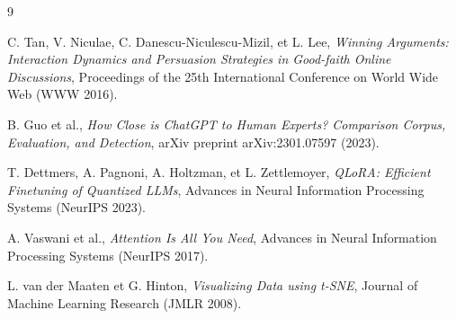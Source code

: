 \documentclass[11pt,a4paper]{article}
\begin{document}
\newpage
\begin{thebibliography}{9}

C. Tan, V. Niculae, C. Danescu-Niculescu-Mizil, et L. Lee,
\textit{Winning Arguments: Interaction Dynamics and Persuasion Strategies in Good-faith Online Discussions},
Proceedings of the 25th International Conference on World Wide Web (WWW 2016).

B. Guo et al.,
\textit{How Close is ChatGPT to Human Experts? Comparison Corpus, Evaluation, and Detection},
arXiv preprint arXiv:2301.07597 (2023).

T. Dettmers, A. Pagnoni, A. Holtzman, et L. Zettlemoyer,
\textit{QLoRA: Efficient Finetuning of Quantized LLMs},
Advances in Neural Information Processing Systems (NeurIPS 2023).

A. Vaswani et al.,
\textit{Attention Is All You Need},
Advances in Neural Information Processing Systems (NeurIPS 2017).

L. van der Maaten et G. Hinton,
\textit{Visualizing Data using t-SNE},
Journal of Machine Learning Research (JMLR 2008).

\end{thebibliography}
\end{document}

